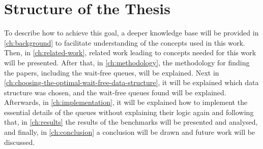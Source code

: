 \section{Structure of the Thesis}\label{sec:structure-of-the-thesis}
To describe how to achieve this goal, a deeper knowledge base will be provided in \cref{ch:background} to facilitate understanding of the concepts used in this work. Then, in \cref{ch:related-work}, related work leading to concepts needed for this work will be presented. After that, in \cref{ch:methodology}, the methodology for finding the papers, including the wait-free queues, will be explained. Next in \cref{ch:choosing-the-optimal-wait-free-data-structure}, it will be explained which data structure was chosen, and the wait-free queues found will be explained. Afterwards, in \cref{ch:implementation}, it will be explained how to implement the essential details of the queues without explaining their logic again and following that, in \cref{ch:results} the results of the benchmarks will be presented and analysed, and finally, in \cref{ch:conclusion} a conclusion will be drawn and future work will be discussed.
